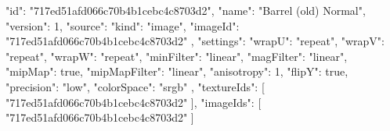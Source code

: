 {
  "id": "717ed51afd066c70b4b1cebc4c8703d2",
  "name": "Barrel (old) Normal",
  "version": 1,
  "source": {
    "kind": "image",
    "imageId": "717ed51afd066c70b4b1cebc4c8703d2"
  },
  "settings": {
    "wrapU": "repeat",
    "wrapV": "repeat",
    "wrapW": "repeat",
    "minFilter": "linear",
    "magFilter": "linear",
    "mipMap": true,
    "mipMapFilter": "linear",
    "anisotropy": 1,
    "flipY": true,
    "precision": "low",
    "colorSpace": "srgb"
  },
  "textureIds": [
    "717ed51afd066c70b4b1cebc4c8703d2"
  ],
  "imageIds": [
    "717ed51afd066c70b4b1cebc4c8703d2"
  ]
}

